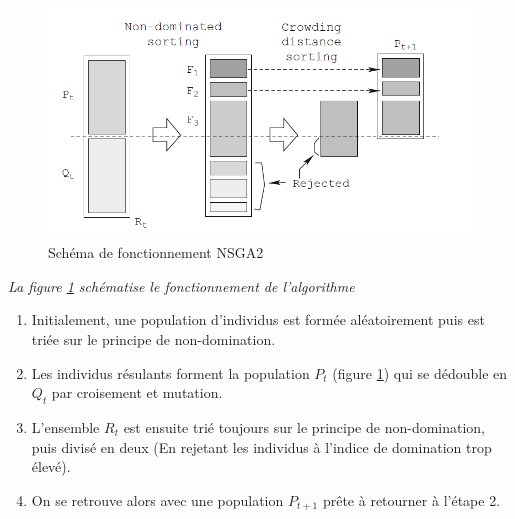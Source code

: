 \documentclass[12pt]{report}
\begin{document}
      \begin{figure}[h]
        \centering
        \includegraphics[width=12cm]{img/sch_nsga2.png}
        \caption{Schéma de fonctionnement NSGA2}
        \label{sch_nsga2}
      \end{figure}

      \emph{La figure \ref{sch_nsga2} schématise le fonctionnement de l'algorithme}
      \begin{enumerate}
        \item Initialement, une population d'individus est formée aléatoirement puis est triée sur le principe de non-domination.
        \item Les individus résulants forment la population $P_{t}$ (figure \ref{sch_nsga2}) qui se dédouble en $Q_{t}$ par croisement et mutation.
        \item L'ensemble $R_{t}$ est ensuite trié toujours sur le principe de non-domination, puis divisé en deux (En rejetant les individus à l'indice de domination trop élevé).
        \item On se retrouve alors avec une population $P_{t+1}$ prête à retourner à l'étape 2.
      \end{enumerate}
\end{document}
